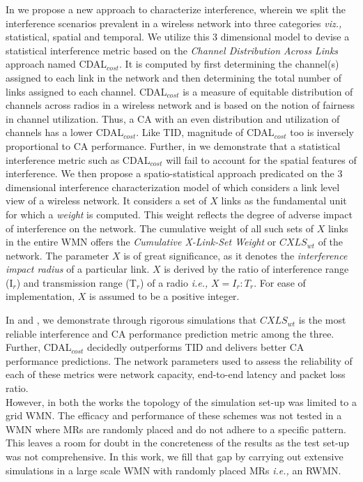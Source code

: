 \documentclass[conference]{IEEEtran}
\begin{document}
In \cite{Manas3} we propose a new approach to characterize interference, wherein we split the interference scenarios prevalent in a wireless network into three categories \textit{viz.,} statistical, spatial and temporal. We utilize this 3 dimensional model to devise a statistical interference metric based on the \textit{Channel Distribution Across Links} approach named CDAL$_{cost}$. It is computed by first determining the channel(s) assigned to each link in the network and then determining the total number of links assigned to each channel. CDAL$_{cost}$ is a measure of equitable distribution of channels across radios in a wireless network and is based on the notion of fairness in channel utilization. Thus, a CA with an even distribution and utilization of channels has a lower CDAL$_{cost}$. Like TID, magnitude of CDAL$_{cost}$ too is inversely proportional to CA performance. Further, in \cite{Manas4} we demonstrate that a statistical interference metric such as CDAL$_{cost}$ will fail to account for the 
spatial features of interference. We then propose a spatio-statistical approach predicated on the 3 dimensional interference characterization model of \cite{Manas3} which considers a link level view of a wireless network. It considers a set of $X$ links as the fundamental unit for which a \textit{weight} is computed. This weight reflects the degree of adverse impact of interference on the network. The cumulative weight of all such sets of $X$ links in the entire WMN offers the \textit{Cumulative X-Link-Set Weight} or $CXLS_{wt}$ of the network. The parameter $X$ is of great significance, as it denotes the \textit{interference impact radius} of a particular link. $X$ is derived by the ratio of interference range (I$_r$) and transmission range (T$_r$) of a radio \emph{i.e.,} $X = I_r:T_r$. For ease of implementation, $X$ is assumed to be a positive integer. 

In \cite{Manas3} and \cite{Manas4}, we demonstrate through rigorous simulations that $CXLS_{wt}$ is the most reliable interference and CA performance prediction metric among the three. Further, CDAL$_{cost}$ decidedly outperforms TID and delivers better CA performance predictions. The network parameters used to assess the reliability of each of these metrics were network capacity, end-to-end latency and packet loss ratio.\\
However, in both the works the topology of the simulation set-up was limited to a grid WMN. The efficacy and performance of these schemes was not tested in a WMN where MRs are randomly placed and do not adhere to a specific pattern. This leaves a room for doubt in the concreteness of the results as the test set-up was not comprehensive. In this work, we fill that gap by carrying out extensive simulations in a large scale WMN with randomly placed MRs \emph{i.e.,} an RWMN. 
\end{document}
